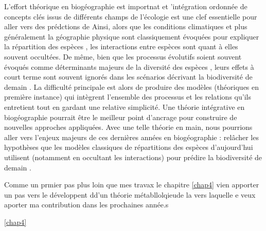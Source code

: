 L'effort théorique en biogéographie est importnat et 'intégration
ordonnée de concepts clés issus de différents champs de l'écologie
\cite{Thuiller2013} est une clef essentielle pour aller vers des
prédctions de Ainsi, alors que les conditions climatiques et plus
généralement la géographie physique sont classiquement évoquées pour
expliquer la répartition des espèces \cite{Kearney2004}, les
interactions entre espèces sont quant à elles souvent occultées. De
même, bien que les processus évolutifs soient souvent évoqués comme
déterminants majeurs de la diversité des espèces \cite{Rosindell2011},
leurs effets à court terme sont souvent ignorés \cite{Parmesan2006} dans
les scénarios décrivant la biodiversité de demain \cite{Lavergne2010}.
La difficulté principale est alors de produire des modèles (théoriques
en première instance) qui intègrent l'ensemble des processus et les
relations qu'ils entretient \cite{Thuiller2013} tout en gardant une
relative simplicité. Une théorie intégrative en biogéographie pourrait
être le meilleur point d'ancrage pour construire de nouvelles approches
appliquées. Avec une telle théorie en main, nous pourrions aller vers
l'enjeux majeurs de ces dernières années en biogéographie : relâcher les
hypothèses que les modèles classiques de répartitions des espèces
d'aujourd'hui utilisent (notamment en occultant les interactions) pour
prédire la biodiversité de demain \cite{Guisan2011}.

Comme un prmier pas plus loin que mes travax le chapitre \ref{chap4}
vien apporter un pas vers le développent dd'un théorie métabllolqieude
la vers laquelle e veux aporter ma contribution dans les prochaines
année.s

\ref{chap4}


